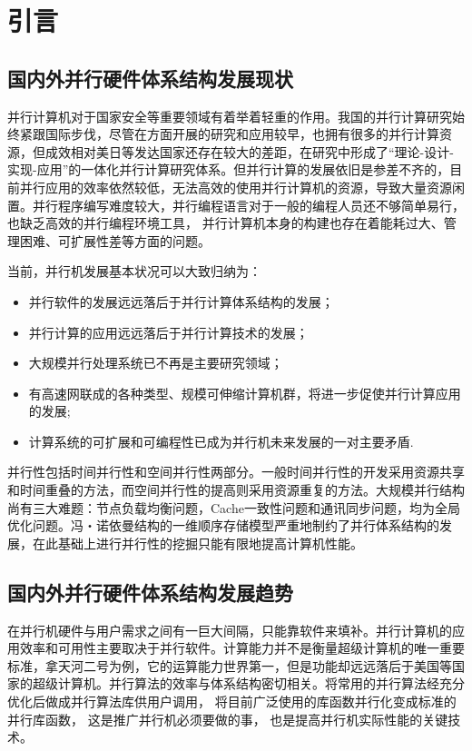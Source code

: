 \documentclass[a4paper]{article}
\begin{document}
\section{引言}
\subsection{国内外并行硬件体系结构发展现状}
并行计算机对于国家安全等重要领域有着举着轻重的作用。我国的并行计算研究始终紧跟国际步伐，尽管在方面开展的研究和应用较早，也拥有很多的并行计算资源，但成效相对美日等发达国家还存在较大的差距，在研究中形成了“理论-设计-实现-应用”的一体化并行计算研究体系。但并行计算的发展依旧是参差不齐的，目前并行应用的效率依然较低，无法高效的使用并行计算机的资源，导致大量资源闲置。并行程序编写难度较大，并行编程语言对于一般的编程人员还不够简单易行，也缺乏高效的并行编程环境工具， 并行计算机本身的构建也存在着能耗过大、管理困难、可扩展性差等方面的问题。

当前，并行机发展基本状况可以大致归纳为：
\begin{itemize}
  \item 并行软件的发展远远落后于并行计算体系结构的发展；
  \item 并行计算的应用远远落后于并行计算技术的发展；
  \item 大规模并行处理系统已不再是主要研究领域；
  \item 有高速网联成的各种类型、规模可伸缩计算机群，将进一步促使并行计算应用的发展;
  \item 计算系统的可扩展和可编程性已成为并行机未来发展的一对主要矛盾.
\end{itemize}

并行性包括时间并行性和空间并行性两部分。一般时间并行性的开发采用资源共享和时间重叠的方法，而空间并行性的提高则采用资源重复的方法。大规模并行结构尚有三大难题：节点负载均衡问题，Cache一致性问题和通讯同步问题，均为全局优化问题。冯・诺依曼结构的一维顺序存储模型严重地制约了并行体系结构的发展，在此基础上进行并行性的挖掘只能有限地提高计算机性能。
\subsection{国内外并行硬件体系结构发展趋势}
在并行机硬件与用户需求之间有一巨大间隔，只能靠软件来填补。并行计算机的应用效率和可用性主要取决于并行软件。计算能力并不是衡量超级计算机的唯一重要标准，拿天河二号为例，它的运算能力世界第一，但是功能却远远落后于美国等国家的超级计算机。并行算法的效率与体系结构密切相关。将常用的并行算法经充分优化后做成并行算法库供用户调用， 将目前广泛使用的库函数并行化变成标准的并行库函数， 这是推广并行机必须要做的事， 也是提高并行机实际性能的关键技术。 
\end{document}
